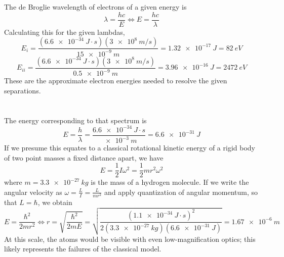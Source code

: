 \documentclass{article}
\begin{document}
\section{}
The de Broglie wavelength of electrons of a given energy is
\[\lambda=\frac{hc}{E}\Leftrightarrow E=\frac{hc}{\lambda}\]
Calculating this for the given lambdas,
\[E_i=\frac{(\SI{6.6e-34}{J\cdot s})(\SI{3e8}{m/s})}{\SI{15e-9}{m}}=\SI{1.32e-17}{J}=\SI{82}{eV}\]
\[E_{ii}=\frac{(\SI{6.6e-34}{J\cdot s})(\SI{3e8}{m/s})}{\SI{0.5e-9}{m}}=\SI{3.96e-16}{J}=\SI{2472}{eV}\]
These are the approximate electron energies needed to resolve the given separations.
\section{}
The energy corresponding to that spectrum is
\[E=\frac{h}{\lambda}=\frac{\SI{6.6e-34}{J\cdot s}}{\SI{e-3}{m}}=\SI{6.6e-31}{J}\]
If we presume this equates to a classical rotational kinetic energy of a rigid body of two point masses a fixed distance apart, we have
\[E=\frac{1}{2}I\omega^2=\frac{1}{2}mr^2\omega^2\]
where $m=\SI{3.3e-27}{kg}$ is the mass of a hydrogen molecule. If we write the angular velocity as $\omega=\frac{L}{I}=\frac{L}{mr^2}$ and apply quantization of angular momentum, so that $L=\hbar$, we obtain
\[E=\frac{\hbar^2}{2mr^2}\Leftrightarrow r=\sqrt{\frac{\hbar^2}{2mE}}=\sqrt{\frac{(\SI{1.1e-34}{J\cdot s})^2}{2(\SI{3.3e-27}{kg})(\SI{6.6e-31}{J})}}=\SI{1.67e-6}{m}\]
At this scale, the atoms would be visible with even low-magnification optics; this likely represents the failures of the classical model.
\end{document}
